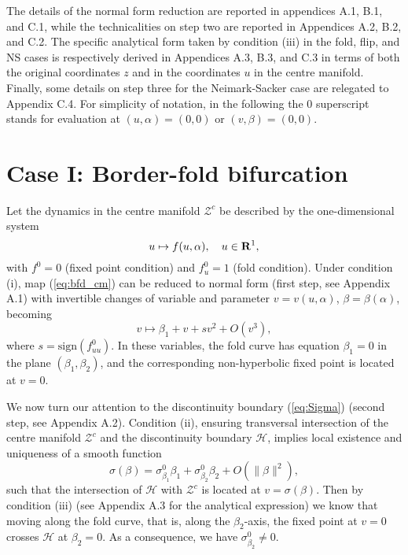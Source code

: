\documentclass[final,onefignum]{siamltex}
\begin{document}
The details of the normal form reduction are reported in appendices A.1, B.1, and C.1, while the technicalities on step two are reported in Appendices A.2, B.2, and C.2.  The specific analytical form taken by condition (iii) in the fold, flip, and NS cases is respectively derived in Appendices A.3, B.3, and C.3 in terms of both the original coordinates $z$ and in the coordinates $u$ in the centre manifold. Finally, some details on step three for the Neimark-Sacker case are relegated to Appendix C.4. For simplicity of notation, in the following the 0 superscript stands for evaluation at $(u,\alpha)=(0,0)$ or $(v,\beta)=(0,0)$.

\section{Case I: Border-fold bifurcation}
\label{sec:bfd}
Let the dynamics in the centre manifold $\mathcal{Z}^c$ be described by the
one-dimensional system
\begin{equation}
\label{eq:bfd_cm}
u \mapsto f(u,\alpha), \quad u\in{{\bf R}}^1,
\end{equation}
with $f^0=0$ (fixed point condition) and $f_u^0=1$ (fold condition).  Under condition (i), map (\ref{eq:bfd_cm}) can be reduced to normal form (first step, see Appendix A.1) with invertible changes of variable and parameter  $v=v(u,\alpha)$, $\beta=\beta(\alpha)$, becoming
\begin{equation}
\label{eq:bfd_nf}
v\mapsto\beta_1+v+sv^2+O(v^3),
\end{equation}
where $s=\mathrm{sign}(f^0_{uu})$.  In these variables, the fold curve has equation $\beta_1=0$ in the plane $(\beta_1,\beta_2)$, and the corresponding non-hyperbolic fixed point is located at $v=0$.

We now turn our attention to the discontinuity boundary (\ref{eq:Sigma}) (second step, see Appendix A.2).
Condition (ii), ensuring transversal intersection of the centre manifold $\mathcal{Z}^c$ and the discontinuity boundary $\mathcal{H}$, implies local existence and uniqueness of a smooth function
$$
\sigma(\beta)=\sigma_{\beta_1}^0\beta_1+\sigma_{\beta_2}^0\beta_2+
O(\|\beta\|^2),
$$
such that the intersection of $\mathcal{H}$
with $\mathcal{Z}^c$ is located at $v=\sigma(\beta)$.  Then by condition (iii) (see Appendix A.3 for the analytical expression) we know that moving along the fold curve, that is, along the $\beta_2$-axis, the fixed point at $v=0$ crosses $\mathcal{H}$ at $\beta_2=0$.  As a consequence, we have $\sigma_{\beta_2}^0\neq0$.
\end{document}
